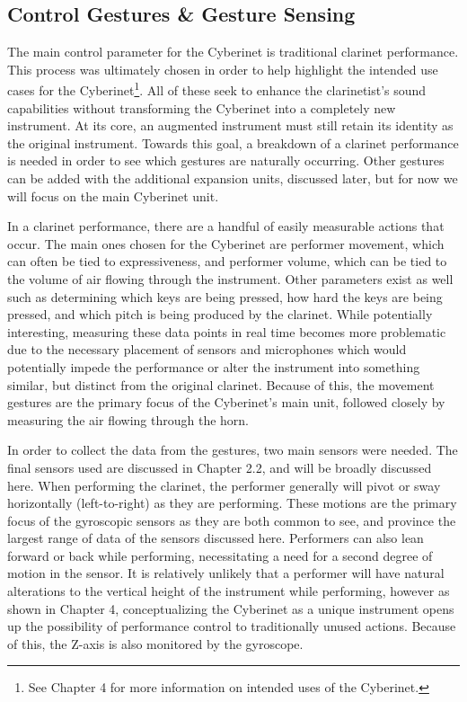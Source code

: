 \subsection{Control Gestures \& Gesture Sensing}
The main control parameter for the Cyberinet is traditional clarinet performance. This process was ultimately chosen in order to help highlight the intended use cases for the Cyberinet\footnote{See Chapter 4 for more information on intended uses of the Cyberinet.}. All of these seek to enhance the clarinetist's sound capabilities without transforming the Cyberinet into a completely new instrument. At its core, an augmented instrument must still retain its identity as the original instrument.\cite{miranda_Wanderley_instrumentControl_2006} Towards this goal, a breakdown of a clarinet performance is needed in order to see which gestures are naturally occurring. Other gestures can be added with the additional expansion units, discussed later, but for now we will focus on the main Cyberinet unit.

In a clarinet performance, there are a handful of easily measurable actions that occur. The main ones chosen for the Cyberinet are performer movement, which can often be tied to expressiveness, and performer volume, which can be tied to the volume of air flowing through the instrument. Other parameters exist as well such as determining which keys are being pressed, how hard the keys are being pressed, and which pitch is being produced by the clarinet. While potentially interesting, measuring these data points in real time becomes more problematic due to the necessary placement of sensors and microphones which would potentially impede the performance or alter the instrument into something similar, but distinct from the original clarinet. Because of this, the movement gestures  are the primary focus of the Cyberinet's main unit, followed closely by measuring the air flowing through the horn.

In order to collect the data from the gestures, two main sensors were needed. The final sensors used are discussed in Chapter 2.2, and will be broadly discussed here. When performing the clarinet, the performer generally will pivot or sway horizontally (left-to-right) as they are performing. These motions are the primary focus of the gyroscopic sensors as they are both common to see, and province the largest range of data of the sensors discussed here. Performers can also lean forward or back while performing, necessitating a need for a second degree of motion in the sensor. It is relatively unlikely that a performer will have natural alterations to the vertical height of the instrument while performing, however as shown in Chapter 4, conceptualizing the Cyberinet as a unique instrument opens up the possibility of performance control to traditionally unused actions. Because of this, the Z-axis is also monitored by the gyroscope.

